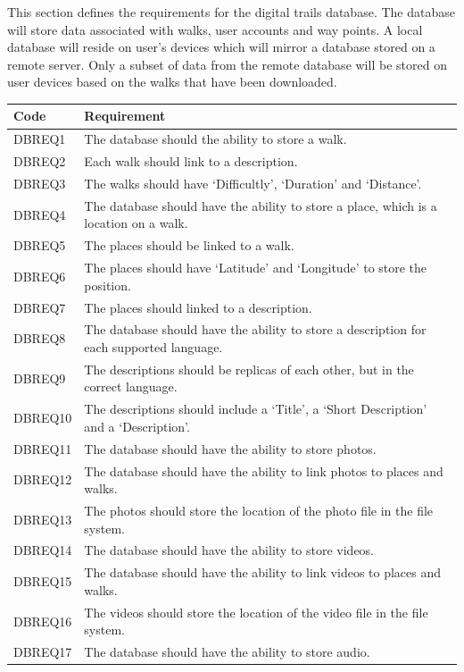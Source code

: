 \documentclass[11pt,a4paper]{article}
\begin{document}
This section defines the requirements for the digital trails database.
The database will store data associated with walks, user accounts and way points.
A local database will reside on user's devices which will mirror a database stored on a remote server.
Only a subset of data from the remote database will be stored on user devices based on the walks that have been downloaded.

\begin{longtable}{|p{2.5cm}p{13cm}|}
\hline
\textbf{Code} & \textbf{Requirement} \\
\hline
DBREQ1 & The database should the ability to store a walk.\\ \hline
DBREQ2 & Each walk should link to a description.  \\ \hline
DBREQ3 & The walks should have `Difficultly', `Duration' and `Distance'. \\ \hline
DBREQ4 & The database should have the ability to store a place, which is a location on a walk.\\ \hline
DBREQ5 & The places should be linked to a walk.\\ \hline
DBREQ6 & The places should have `Latitude' and `Longitude' to store the position. \\ \hline
DBREQ7 & The places should linked to a description. \\ \hline
DBREQ8 & The database should have the ability to store a description for each supported language. \\ \hline
DBREQ9 & The descriptions should be replicas of each other, but in the correct language. \\ \hline
DBREQ10 & The descriptions should include a `Title', a `Short Description' and a `Description'.\\ \hline
DBREQ11 & The database should have the ability to store photos. \\ \hline
DBREQ12 & The database should have the ability to link photos to places and walks.\\ \hline
DBREQ13 & The photos should store the location of the photo file in the file system.\\ \hline
DBREQ14 & The database should have the ability to store videos. \\ \hline
DBREQ15 & The database should have the ability to link videos to places and walks.\\ \hline
DBREQ16 & The videos should store the location of the video file in the file system.\\ \hline
DBREQ17 & The database should have the ability to store audio. \\ \hline

\end{longtable}
\end{document}
